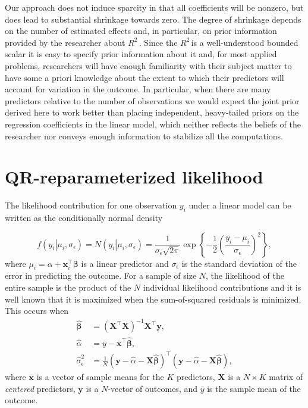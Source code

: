 \documentclass[11pt]{article}
\newcommand{\Rsq}{$R^2\,$}
\newcommand{\boldbeta}{\boldsymbol{\beta}}
\newcommand{\hatbeta}{\widehat{\boldbeta}}
\newcommand{\hatalpha}{\widehat{\alpha}}
\newcommand{\sigmaEps}{\sigma_{\epsilon}}
\newcommand{\X}{\mathbf{X}}
\newcommand{\y}{\mathbf{y}}
\newcommand{\given}{\left.\right|}
\begin{document}
Our approach does not induce sparcity in that all coefficients will be nonzero,
but does lead to substantial shrinkage towards zero. The degree of shrinkage
depends on the number of estimated effects and, in particular, on prior
information provided by the researcher about \Rsq. Since the \Rsq is a
well-understood bounded scalar it is easy to specify prior information about it
and, for most applied problems, researchers will have enough familiarity with
their subject matter to have some a priori knowledge about the extent to which
their predictors will account for variation in the outcome. In particular, when
there are many predictors relative to the number of observations we would expect
the joint prior derived here to work better than placing independent,
heavy-tailed priors on the regression coefficients in the linear model, which
neither reflects the beliefs of the researcher nor conveys enough information to
stabilize all the computations.

\section{QR-reparameterized likelihood}
\label{sec:likelihood}

The likelihood contribution for one observation $y_i$ under a linear model
can be written as the conditionally normal density

$$
f \left(y_i \given \mu_i, \sigmaEps \right) =
N\left(y_i \given \mu_i, \sigmaEps \right) =
\frac{1}{\sigmaEps \sqrt{2 \pi}}
\exp{\left\{-\frac{1}{2} \left(\frac{y_i - \mu_i}{\sigmaEps}\right)^2\right\}},
$$
%
where $\mu_i = \alpha + \mathbf{x}_i^\top \boldbeta$ is a linear predictor and
$\sigmaEps$ is the standard deviation of the error in predicting the outcome.
For a sample of size $N$, the likelihood of the entire sample is the product of
the $N$ individual likelihood contributions and it is well known that it is
maximized when the sum-of-squared residuals is minimized. This occurs when
%
\begin{align*}
\hatbeta &= \left(\X^\top \X \right)^{-1} \X^\top \y,\\
\hatalpha &= \overline{y} - \overline{\mathbf{x}}^\top \hatbeta,\\
\widehat{\sigma}_{\epsilon}^2 &=
  \frac{1}{N}
  \left(\y - \hatalpha - \X \hatbeta \right)^\top
  \left(\y - \hatalpha - \X \hatbeta \right),
\end{align*}
%
where $\overline{\mathbf{x}}$ is a vector of sample means for the
$K$ predictors, $\X$ is a $N \times K$ matrix of \emph{centered} predictors,
$\y$ is a $N$-vector of outcomes, and $\overline{y}$ is the sample mean of the
outcome.
\end{document}
